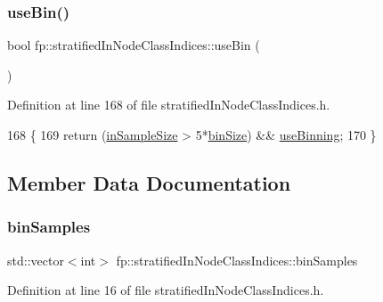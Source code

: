 \subsubsection{\texorpdfstring{use\+Bin()}{useBin()}}
{\footnotesize\ttfamily bool fp\+::stratified\+In\+Node\+Class\+Indices\+::use\+Bin (\begin{DoxyParamCaption}{ }\end{DoxyParamCaption})\hspace{0.3cm}{\ttfamily [inline]}}



Definition at line 168 of file stratified\+In\+Node\+Class\+Indices.\+h.


\begin{DoxyCode}
168                                 \{
169                 \textcolor{keywordflow}{return} (\hyperlink{classfp_1_1stratifiedInNodeClassIndices_a2acb617e3212806ae7f994d925bd1468}{inSampleSize} > 5*\hyperlink{classfp_1_1stratifiedInNodeClassIndices_aeb008fe5e4d29845a675175590ef2de3}{binSize}) && 
      \hyperlink{classfp_1_1stratifiedInNodeClassIndices_af6ca8b8a4539b8c35008cce88961fa00}{useBinning};
170             \}
\end{DoxyCode}


\subsection{Member Data Documentation}
\mbox{\label{classfp_1_1stratifiedInNodeClassIndices_a399e239f3f3175e44ca409be96de0d32}} 
\subsubsection{\texorpdfstring{bin\+Samples}{binSamples}}
{\footnotesize\ttfamily std\+::vector$<$int$>$ fp\+::stratified\+In\+Node\+Class\+Indices\+::bin\+Samples\hspace{0.3cm}{\ttfamily [private]}}



Definition at line 16 of file stratified\+In\+Node\+Class\+Indices.\+h.

\mbox{\label{classfp_1_1stratifiedInNodeClassIndices_aeb008fe5e4d29845a675175590ef2de3}} 
